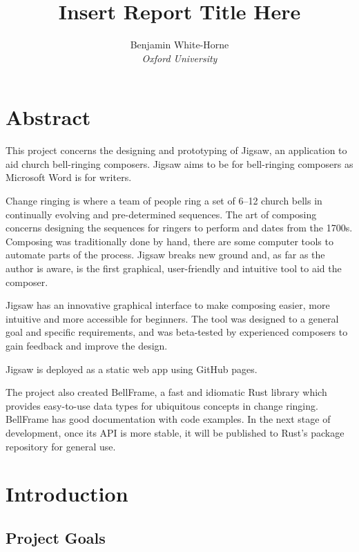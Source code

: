 \documentclass[12pt]{article}
\title{Insert Report Title Here}
\author{Benjamin White-Horne \\ \emph{Oxford University}}
\begin{document}
\maketitle



\pagebreak

\section*{Abstract}

This project concerns the designing and prototyping of Jigsaw, an application to aid church
bell-ringing composers.  Jigsaw aims to be for bell-ringing composers as Microsoft Word is for
writers.

Change ringing is where a team of people ring a set of 6--12 church bells in continually evolving and
pre-determined sequences. The art of composing concerns designing the sequences for ringers to
perform and dates from the 1700s.  Composing was traditionally done by hand, there are some computer
tools to automate parts of the process. Jigsaw breaks new ground and, as far as the author is aware,
is the first graphical, user-friendly and intuitive tool to aid the composer.

Jigsaw has an innovative graphical interface to make composing easier, more intuitive and more
accessible for beginners. The tool was designed to a general goal and specific requirements, and was
beta-tested by experienced composers to gain feedback and improve the design.

Jigsaw is deployed as a static web app using GitHub pages.

The project also created BellFrame, a fast and idiomatic Rust library which provides easy-to-use
data types for ubiquitous concepts in change ringing. BellFrame has good documentation with code
examples. In the next stage of development, once its API is more stable, it will be published to
Rust's package repository for general use.



\pagebreak

\tableofcontents



\pagebreak

\section{Introduction}

\subsection{Project Goals}\label{sec:design-goals}
\end{document}
